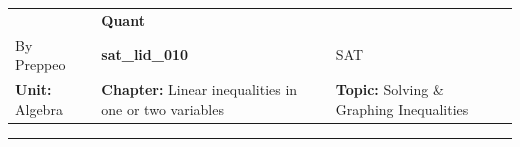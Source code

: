 \documentclass[11pt,paper=a4,answers]{exam}
\begin{document}
\begin{center}
    \centering
    \renewcommand{\arraystretch}{1.5}
    \begin{tabularx}{\textwidth}{YYY}
    & \normalsize\bf{{\Large{{Quant}}}} & \\
    By Preppeo & \normalsize\bf{{sat\_lid\_010}} & SAT\\
    \normalsize{{\textbf{{Unit:}} Algebra}} & \normalsize{{\textbf{{Chapter:}} Linear inequalities in one or two variables}} & \normalsize{{\textbf{{Topic:}} Solving \& Graphing Inequalities}} \\
    \end{tabularx}
\end{center}
\par\noindent\rule{\textwidth}{1pt}
\end{document}
